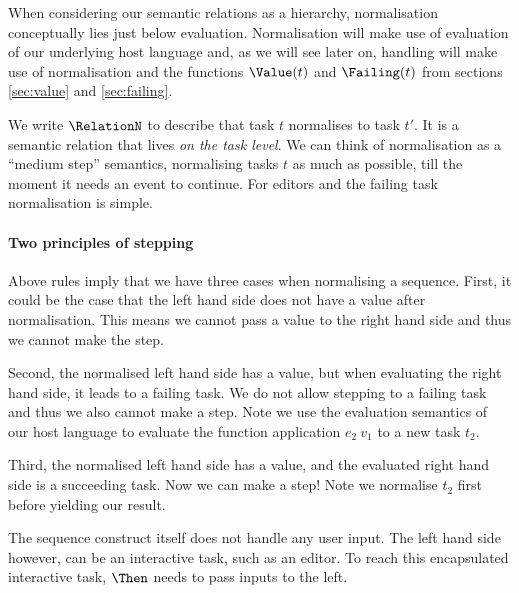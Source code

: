 When considering our semantic relations as a hierarchy,
normalisation conceptually lies just below evaluation.
Normalisation will make use of evaluation of our underlying host language and,
as we will see later on,
handling will make use of normalisation
and the functions $\Value(t)$ and $\Failing(t)$ from sections \autoref{sec:value} and \autoref{sec:failing}.

We write $\RelationN$ to describe that
task $t$ normalises to task $t'$.
It is a semantic relation that lives \emph{on the task level}.
We can think of normalisation as a \enquote{medium step} semantics,
normalising tasks $t$ as much as possible,
till the moment it needs an event to continue.
For editors and the failing task normalisation is simple.



\paragraph{Two principles of stepping}
\label{sec:stepping-principles}


Above rules imply that we have three cases when normalising a sequence.
First,
it could be the case that the left hand side does not have a value after normalisation.
This means we cannot pass a value to the right hand side
and thus we cannot make the step.

Second,
the normalised left hand side has a value,
but when evaluating the right hand side,
it leads to a failing task.
We do not allow stepping to a failing task
and thus we also cannot make a step.
Note we use the evaluation semantics of our host language
to evaluate the function application $e_2\ v_1$ to a new task $t_2$.

Third,
the normalised left hand side has a value,
and the evaluated right hand side is a succeeding task.
Now we can make a step!
Note we normalise $t_2$ first before yielding our result.

The sequence construct itself does not handle any user input.
The left hand side however,
can be an interactive task, such as an editor.
To reach this encapsulated interactive task,
$\Then$ needs to pass inputs to the left.



